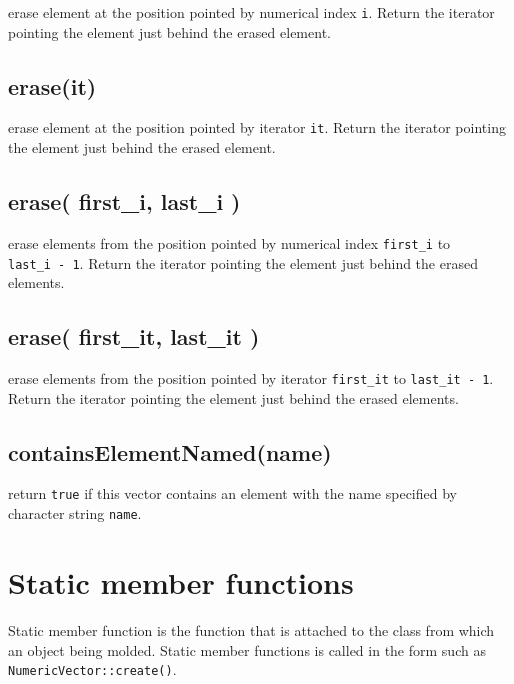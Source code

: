 \documentclass[]{book}
\begin{document}
erase element at the position pointed by numerical index \texttt{i}. Return the iterator pointing the element just behind the erased element.

\hypertarget{eraseit}{%
\subsection{erase(it)}\label{eraseit}}

erase element at the position pointed by iterator \texttt{it}. Return the iterator pointing the element just behind the erased element.

\hypertarget{erase-first_i-last_i}{%
\subsection{erase( first\_i, last\_i )}\label{erase-first_i-last_i}}

erase elements from the position pointed by numerical index \texttt{first\_i} to \texttt{last\_i\ -\ 1}. Return the iterator pointing the element just behind the erased elements.

\hypertarget{erase-first_it-last_it}{%
\subsection{erase( first\_it, last\_it )}\label{erase-first_it-last_it}}

erase elements from the position pointed by iterator \texttt{first\_it} to \texttt{last\_it\ -\ 1}. Return the iterator pointing the element just behind the erased elements.

\hypertarget{containselementnamedname}{%
\subsection{containsElementNamed(name)}\label{containselementnamedname}}

return \texttt{true} if this vector contains an element with the name specified by character string \texttt{name}.

\hypertarget{static-member-functions}{%
\section{Static member functions}\label{static-member-functions}}

Static member function is the function that is attached to the class from which an object being molded. Static member functions is called in the form such as \texttt{NumericVector::create()}.
\end{document}
